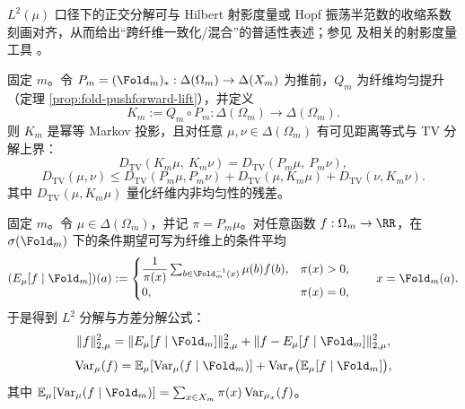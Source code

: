 \begin{remark}[与射影度量收缩口径的对齐]\label{rem:pom-fold-projective-metric}
$L^2(\mu)$ 口径下的正交分解可与 Hilbert 射影度量或 Hopf 振荡半范数的收缩系数刻画对齐，从而给出“跨纤维一致化/混合”的普适性表述；参见 \cite{GaubertQu2015DobrushinCones} 及相关的射影度量工具 \cite{ReebKastoryanoWolf2011HilbertProjectiveQuantum}。
\end{remark}

固定 $m$。令 $P_m=(\Fold_m)_*:\Delta(\Omega_m)\to\Delta(X_m)$ 为推前，$Q_m$ 为纤维均匀提升（定理 \ref{prop:fold-pushforward-lift}），并定义
\begin{equation}
\label{eq:pom-Km-def}
K_m:=Q_m\circ P_m:\Delta(\Omega_m)\to\Delta(\Omega_m).
\end{equation}
则 $K_m$ 是幂等 Markov 投影，且对任意 $\mu,\nu\in\Delta(\Omega_m)$ 有可见距离等式与 TV 分解上界：
\begin{equation}
\label{eq:pom-tv-visible-equality}
D_{\mathrm{TV}}(K_m\mu,\ K_m\nu)=D_{\mathrm{TV}}(P_m\mu,\ P_m\nu),
\end{equation}
\begin{equation}
\label{eq:pom-tv-decomposition-upper}
D_{\mathrm{TV}}(\mu,\nu)\le D_{\mathrm{TV}}(P_m\mu,P_m\nu)+D_{\mathrm{TV}}(\mu,K_m\mu)+D_{\mathrm{TV}}(\nu,K_m\nu).
\end{equation}
其中 $D_{\mathrm{TV}}(\mu,K_m\mu)$ 量化纤维内非均匀性的残差。

固定 $m$。令 $\mu\in\Delta(\Omega_m)$，并记 $\pi=P_m\mu$。对任意函数 $f:\Omega_m\to\RR$，在 $\sigma(\Fold_m)$ 下的条件期望可写为纤维上的条件平均
\begin{equation}
\label{eq:pom-Emu-def}
(E_{\mu}[f\mid\Fold_m])(a)
:=
\begin{cases}
\dfrac{1}{\pi(x)}\sum_{b\in\Fold_m^{-1}(x)}\mu(b)f(b),& \pi(x)>0,\\
0,& \pi(x)=0,
\end{cases}
\qquad x=\Fold_m(a).
\end{equation}
于是得到 $L^2$ 分解与方差分解公式：
\begin{equation}
\label{eq:pom-Emu-pythagoras}
\|f\|_{2,\mu}^2=\|E_{\mu}[f\mid\Fold_m]\|_{2,\mu}^2+\|f-E_{\mu}[f\mid\Fold_m]\|_{2,\mu}^2,
\end{equation}
\begin{equation}
\label{eq:pom-var-decomposition}
\mathrm{Var}_{\mu}(f)=\mathbb{E}_{\mu}[\mathrm{Var}_{\mu}(f\mid\Fold_m)]+\mathrm{Var}_{\pi}\bigl(\mathbb{E}_{\mu}[f\mid\Fold_m]\bigr),
\end{equation}
其中 $\mathbb{E}_{\mu}[\mathrm{Var}_{\mu}(f\mid\Fold_m)]=\sum_{x\in X_m}\pi(x)\,\mathrm{Var}_{\mu_x}(f)$。

